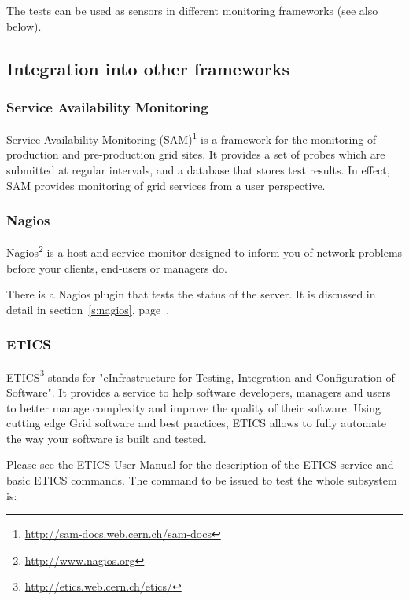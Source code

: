 The tests can be used as sensors in different monitoring frameworks
(see also below).




\subsection{Integration into other frameworks}

\subsubsection{Service Availability Monitoring}

Service Availability Monitoring
(SAM)\footnote{\url{http://sam-docs.web.cern.ch/sam-docs}} is a framework for
the monitoring of production and pre-production grid sites. It provides a set
of probes which are submitted at regular intervals, and a database that stores
test results. In effect, SAM provides monitoring of grid services from a user
perspective.



\subsubsection{Nagios}

Nagios\footnote{\url{http://www.nagios.org}} is a host and service monitor
designed to inform you of network problems before your clients, end-users or
managers do.

There is a Nagios plugin that tests the status of the \LB server. It is discussed in detail in section~\ref{s:nagios}, page~\pageref{s:nagios}.


\subsubsection{ETICS}

ETICS\footnote{\url{http://etics.web.cern.ch/etics/}} stands for
"eInfrastructure for Testing, Integration and Configuration of Software". It
provides a service to help software developers, managers and users to better
manage complexity and improve the quality of their software. Using cutting
edge Grid software and best practices, ETICS allows to fully automate
the way your software is built and tested.

Please see the ETICS User Manual \cite{etics_manual} for the description
of the ETICS service and basic ETICS commands. The command to be issued to
test the whole \LB subsystem is:

